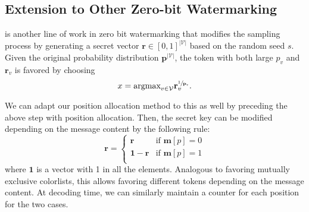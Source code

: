\subsection{Extension to Other Zero-bit Watermarking}\label{appendix:other-zwb}
\citet{openai-watermark} is another line of work in zero bit watermarking that modifies the sampling process by generating a secret vector $\mathbf{r}\in [0,1]^{|\mathcal{V}|}$ based on the random seed $s$. Given the original probability distribution $\mathbf{p}^{|\mathcal{V}|}$, the token with both large $p_v$ and $\mathbf{r}_v$ is favored by choosing  
\begin{equation}
    x = \text{argmax}_{v\in \mathcal{V}}\mathbf{r}_v^{\sfrac{1}{\mathbf{p}_v}}.
\end{equation}

We can adapt our position allocation method to this as well by preceding the above step with position allocation. Then, the secret key can be modified depending on the message content by the following rule:
\begin{equation}
    \mathbf{r} = 
        \begin{cases}
            \mathbf{r} & \text{if }\mathbf{m}[p] = 0  \\
            \mathbf{1} -\mathbf{r} & \text{if }\mathbf{m}[p] = 1 \\
        \end{cases}
\end{equation}
where $\mathbf{1}$ is a vector with 1 in all the elements. Analogous to favoring mutually exclusive colorlists, this allows favoring different tokens depending on the message content. At decoding time, we can similarly maintain a counter for each position for the two cases.  







